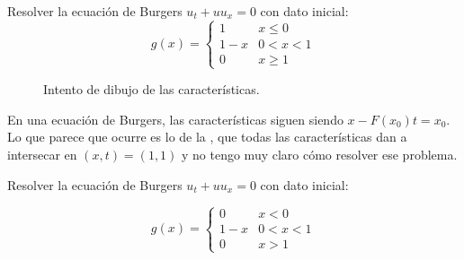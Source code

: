\begin{problem}[2] Resolver la ecuación de Burgers $u_t + uu_x = 0$ con dato inicial:
	\[ g(x) =
	\begin{cases}
		1 & x \leq 0 \\
		1-x & 0 < x < 1 \\
		0 & x \geq 1
	\end{cases} \]

	\solution

	\begin{figure}[hbtp]
	\centering
	\caption{Intento de dibujo de las características.}
	\label{fig:Hoja1:E2}
	\end{figure}

	En una ecuación de Burgers, las características siguen siendo $x-F(x_0) t = x_0$. Lo que parece que ocurre es lo de la , que todas las características dan a intersecar en $(x,t) = (1,1)$ y no tengo muy claro cómo resolver ese problema.

\end{problem}

\begin{problem}[3] Resolver la ecuación de Burgers $u_t + uu_x = 0$ con dato inicial:

	$$ g(x) =
	\begin{cases}
		0 & x < 0 \\
		1-x & 0 < x < 1 \\
		0 & x > 1
	\end{cases}$$

	\solution

\end{problem}

